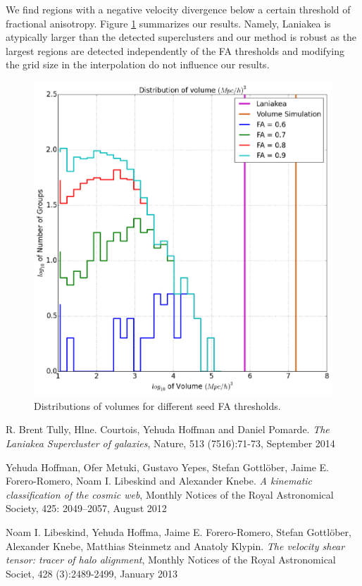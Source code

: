 \documentclass[preprint,proceedings]{rmaa}
\begin{document}
We find regions with a negative velocity divergence below a
certain threshold of fractional anisotropy.
Figure
\ref{fig:simple} summarizes our results. Namely, Laniakea is atypically larger than the detected
superclusters and our method is robust as the largest regions are detected independently of the
FA thresholds and modifying the grid size in the interpolation do not influence our
results.
\begin{figure}[!t]
  \includegraphics[width=\columnwidth]{SDHernandezSTDivJFig1}
  \caption{Distributions of volumes for different seed FA thresholds.
}
  \label{fig:simple}
\end{figure}


\begin{thebibliography}

 R. Brent Tully, Hlne. Courtois, Yehuda Hoffman and Daniel Pomarde. 
{\em The Laniakea Supercluster of galaxies}, Nature, 513 (7516):71-73, September 2014 
 
 Yehuda Hoffman, Ofer Metuki, Gustavo Yepes, Stefan Gottlöber, Jaime E. Forero-Romero, Noam I. Libeskind and Alexander Knebe. 
{\em A kinematic classification of the cosmic web}, Monthly Notices of the Royal Astronomical Society, 425: 2049–2057, August 2012

 Noam I. Libeskind, Yehuda Hoffma, Jaime E. Forero-Romero, Stefan Gottlöber, Alexander Knebe, Matthias Steinmetz and Anatoly Klypin. 
{\em The velocity shear tensor: tracer of halo alignment}, Monthly Notices of the Royal Astronomical Societ, 428 (3):2489-2499, January 2013
  
\end{thebibliography}
\end{document}
